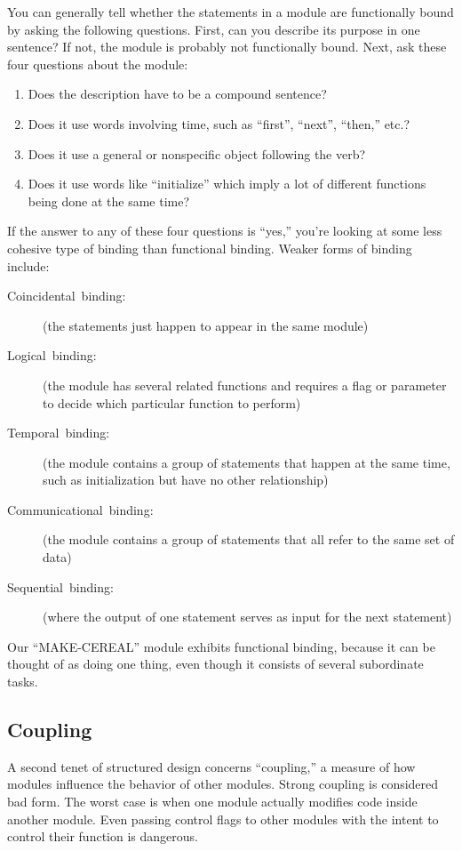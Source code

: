 You can generally tell whether the statements in a module are
functionally bound by asking the following questions. First, can you
describe its purpose in one sentence? If not, the module is probably
not functionally bound. Next, ask these four questions about the
module:
\begin{enumerate}
\item Does the description have to be a compound sentence?
\item Does it use words involving time, such as ``first'', ``next'',
``then,'' etc.?
\item Does it use a general or nonspecific object following the verb?
\item Does it use words like ``initialize'' which imply a lot of
different functions being done at the same time?
\end{enumerate}
If the answer to any of these four questions is ``yes,'' you're
looking at some less cohesive type of binding than functional binding.
Weaker forms of binding include:

\begin{description}
\item [Coincidental~binding:]
(the statements just happen to appear in the same module)
\item [Logical~binding:]
(the module has several related functions and requires a flag or
parameter to decide which particular function to perform)
\item [Temporal~binding:]
(the module contains a group of statements that happen at the same
time, such as initialization but have no other relationship)
\item [Communicational~binding:]
(the module contains a group of statements that all refer
to the same set of data)
\item [Sequential~binding:]
(where the output of one statement serves as input for the next statement)
\end{description}
Our ``MAKE-CEREAL'' module exhibits functional binding, because
it can be thought of as doing one thing, even though it consists of
several subordinate tasks.


\subsection{Coupling}
A second tenet of structured design concerns ``coupling,'' a measure
of how modules influence the behavior of other modules.  Strong
coupling is considered bad form. The worst case is when one module
actually modifies code inside another module. Even passing control
flags to other modules with the intent to control their function is
dangerous.

